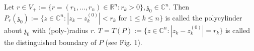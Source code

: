 Let $r \in V_+ := \{r = (r_1, \ldots, r_n) \in \mathbb{R}^n: r_k > 0\}, \mathfrak{z}_0 \in \mathbb{C}^n$. Then $P_r(\mathfrak{z}_0) := \{z \in \mathbb{C}^n: |z_k - z_k^{(0)}| < r_k$ for $1 \leq k \leq n\}$ is called the polycylinder about $\mathfrak{z}_0$ with (poly-)radius $r$. $T = T(P) := \{z \in \mathbb{C}^n: |z_k - z_k^{(0)}| = r_k\}$ is called the distinguished boundary of $P$ (see Fig. 1).
